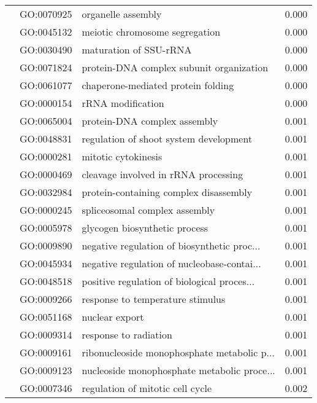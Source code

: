 \begin{longtable}{lllr}
   & GO:0070925 &                           organelle assembly &         0.000 \\
   & GO:0045132 &               meiotic chromosome segregation &         0.000 \\
   & GO:0030490 &                       maturation of SSU-rRNA &         0.000 \\
   & GO:0071824 &     protein-DNA complex subunit organization &         0.000 \\
   & GO:0061077 &           chaperone-mediated protein folding &         0.000 \\
   & GO:0000154 &                            rRNA modification &         0.000 \\
   & GO:0065004 &                 protein-DNA complex assembly &         0.001 \\
   & GO:0048831 &       regulation of shoot system development &         0.001 \\
   & GO:0000281 &                          mitotic cytokinesis &         0.001 \\
   & GO:0000469 &         cleavage involved in rRNA processing &         0.001 \\
   & GO:0032984 &       protein-containing complex disassembly &         0.001 \\
   & GO:0000245 &                spliceosomal complex assembly &         0.001 \\
   & GO:0005978 &                glycogen biosynthetic process &         0.001 \\
   & GO:0009890 &  negative regulation of biosynthetic proc... &         0.001 \\
   & GO:0045934 &  negative regulation of nucleobase-contai... &         0.001 \\
   & GO:0048518 &  positive regulation of biological proces... &         0.001 \\
   & GO:0009266 &             response to temperature stimulus &         0.001 \\
   & GO:0051168 &                               nuclear export &         0.001 \\
   & GO:0009314 &                        response to radiation &         0.001 \\
   & GO:0009161 &  ribonucleoside monophosphate metabolic p... &         0.001 \\
   & GO:0009123 &  nucleoside monophosphate metabolic proce... &         0.001 \\
   & GO:0007346 &             regulation of mitotic cell cycle &         0.002 \\

\end{longtable}
